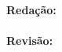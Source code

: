%

\begin{adjustwidth}{0pt}{0.2\textwidth}
	\begin{flushleft}
		\proposta\\
		\bigskip
		\textbf{Redação:}\\
		\equipaRedatora\\
		\bigskip
		\textbf{Revisão:}\\
		\equipaRevisora
	\end{flushleft}
\end{adjustwidth}